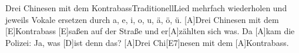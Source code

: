 \documentclass[../main.tex]{subfiles}
\begin{document}
\begin{songwithoutpagebreak}{Drei Chinesen mit dem Kontrabass}{Traditionell}{Lied mehrfach wiederholen und jeweils Vokale ersetzen durch a, e, i, o, u, ä, ö, ü.}
[A]Drei Chinesen mit dem [E]Kontrabass
[E]saßen auf der Straße und er[A]zählten sich was.
Da [A]kam die Polizei: Ja, was [D]ist denn das?
[A]Drei Chi[E7]nesen mit dem [A]Kontrabass.
\end{songwithoutpagebreak}
\end{document}
